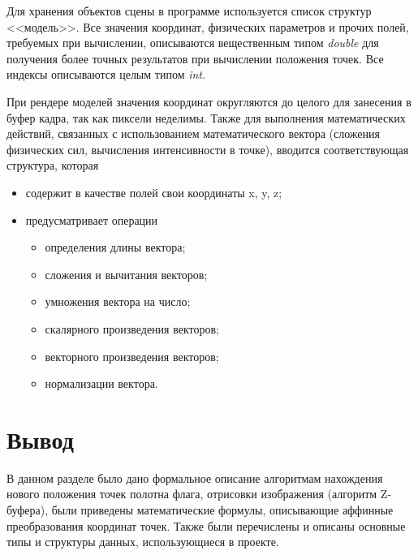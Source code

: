 \vspace{0.2cm}Для хранения объектов сцены в программе используется список структур <<модель>>. Все значения координат, физических параметров и прочих полей, требуемых при вычислении, описываются вещественным типом \textit{double} для получения более точных результатов при вычислении положения точек. Все индексы описываются целым типом \textit{int}.

\vspace{0.2cm}При рендере моделей значения координат округляются до целого для занесения в буфер кадра, так как пиксели неделимы. Также для выполнения математических действий, связанных с использованием математического вектора (сложения физических сил, вычисления интенсивности в точке), вводится соответствующая структура, которая
\begin{itemize}
	\item содержит в качестве полей свои координаты x, y, z;
	\item предусматривает операции
	\begin{itemize}
		\item определения длины вектора;
		\item сложения и вычитания векторов;
		\item умножения вектора на число;
		\item скалярного произведения векторов;
		\item векторного произведения векторов;
		\item нормализации вектора.
	\end{itemize}
\end{itemize}

\section{Вывод}
\hspace{0.6cm}В данном разделе было дано формальное описание алгоритмам нахождения нового положения точек полотна флага, отрисовки изображения (алгоритм Z-буфера), были приведены математические формулы, описывающие аффинные преобразования координат точек. Также были перечислены и описаны основные типы и структуры данных, использующиеся в проекте.
